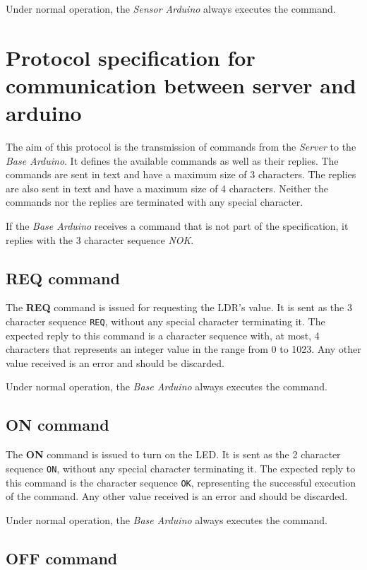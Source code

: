 \documentclass[conference, a4paper]{IEEEtran}
\begin{document}
Under normal operation, the \textit{Sensor Arduino} always executes the command.

\section{Protocol specification for communication between server and arduino}
\label{prot_serv}

The aim of this protocol is the transmission of commands from the \textit{Server} to the \textit{Base Arduino}. It defines the available commands as well as their replies. The commands are sent in text and have a maximum size of 3 characters. The replies are also sent in text and have a maximum size of 4 characters. Neither the commands nor the replies are terminated with any special character.

If the \textit{Base Arduino} receives a command that is not part of the specification, it replies with the 3 character sequence \textit{NOK}.

\subsection{REQ command}

The \textbf{REQ} command is issued for requesting the LDR's value. It is sent as the 3 character sequence \texttt{REQ}, without any special character terminating it. The expected reply to this command is a character sequence with, at most, 4 characters that represents an integer value in the range from 0 to 1023. Any other value received is an error and should be discarded.

Under normal operation, the \textit{Base Arduino} always executes the command.

\subsection{ON command}

The \textbf{ON} command is issued to turn on the LED. It is sent as the 2 character sequence \texttt{ON}, without any special character terminating it. The expected reply to this command is the character sequence \texttt{OK}, representing the successful execution of the command. Any other value received is an error and should be discarded.

Under normal operation, the \textit{Base Arduino} always executes the command.

\subsection{OFF command}
\end{document}
